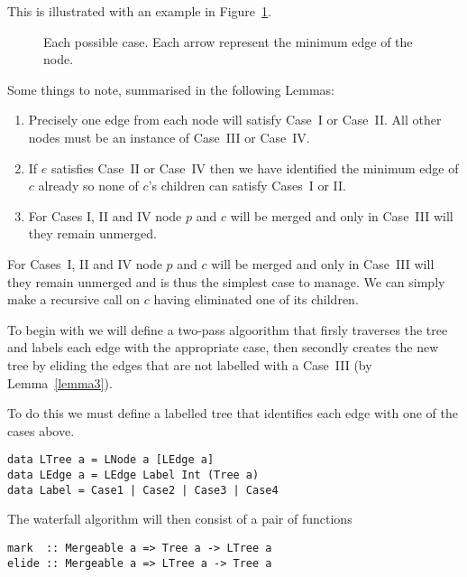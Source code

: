 \documentclass{jfp}
\begin{document}
This is illustrated with an example in Figure~\ref{fig:cases}.

\begin{figure}
\centering
\ifpdf
\else
\fi
\caption{Each possible case. Each arrow represent the minimum edge of
the node.}
\label{fig:cases}
\end{figure}


Some things to note, summarised in the following Lemmas:
\begin{enumerate}

\item Precisely one edge from each node will satisfy Case~I or
  Case~II. All other nodes must be an instance of Case~III or Case~IV.
\label{lemma1}

\item If $e$ satisfies Case~II or Case~IV then we have identified the
  minimum edge of $c$ already so none of $c$'s children can satisfy
  Cases~I or II.
\label{lemma2}

\item For Cases I, II and IV node $p$ and $c$ will be merged and only
  in Case~III will they remain unmerged.
\label{lemma3}

\end{enumerate}

For Cases~I, II and IV node $p$ and $c$ will be merged and only in Case~III
will they remain unmerged and is thus the simplest case to manage.  We
can simply make a recursive call on $c$ having eliminated one of its
children.

To begin with we will define a two-pass algoorithm that firsly
traverses the tree and labels each edge with the appropriate case,
then secondly creates the new tree by eliding the edges that are not
labelled with a Case~III (by Lemma~\ref{lemma3}).

To do this we must define a labelled tree that identifies each edge
with one of the cases above.


\begin{verbatim}
data LTree a = LNode a [LEdge a]
data LEdge a = LEdge Label Int (Tree a)
data Label = Case1 | Case2 | Case3 | Case4
\end{verbatim}

The waterfall algorithm will then consist of a pair of functions

\begin{verbatim}
mark  :: Mergeable a => Tree a -> LTree a
elide :: Mergeable a => LTree a -> Tree a
\end{verbatim}
\end{document}
